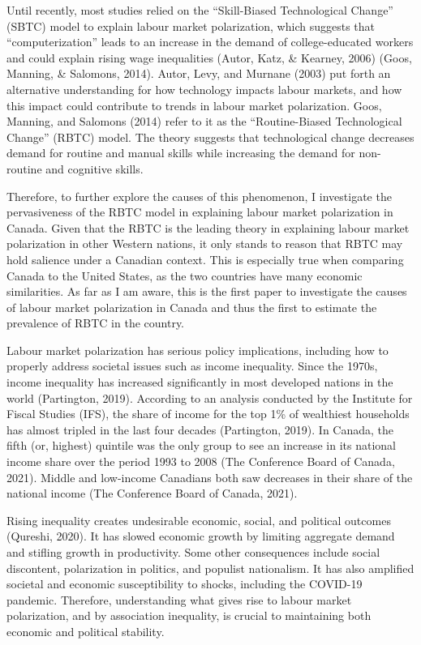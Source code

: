 \documentclass[undefended]{bumrp}
\begin{document}
Until recently, most studies relied on the “Skill-Biased Technological Change” (SBTC) model to explain labour market polarization, which suggests that “computerization” leads to an increase in the demand of college-educated workers and could explain rising wage inequalities (Autor, Katz, \& Kearney, 2006) (Goos, Manning, \& Salomons, 2014). Autor,  Levy,  and Murnane (2003) put forth an alternative understanding for how technology impacts labour markets, and how this impact could contribute to trends in labour market polarization. Goos, Manning, and Salomons (2014) refer to it as the “Routine-Biased Technological Change” (RBTC) model. The theory suggests that technological change decreases demand for routine and manual skills while increasing the demand for non-routine and cognitive skills.

Therefore, to further explore the causes of this phenomenon, I investigate the pervasiveness of the RBTC model in explaining labour market polarization in Canada. Given that the RBTC is the leading theory in explaining labour market polarization in other Western nations, it only stands to reason that RBTC may hold salience under a Canadian context. This is especially true when comparing Canada to the United States, as the two countries have many economic similarities. As far as I am aware, this is the first paper to investigate the causes of labour market polarization in Canada and thus the first to estimate the prevalence of RBTC in the country.

Labour market polarization has serious policy implications, including how to properly address societal issues such as income inequality. Since the 1970s, income inequality has increased significantly in most developed nations in the world (Partington, 2019). According to an analysis conducted by the Institute for Fiscal Studies (IFS), the share of income for the top 1\% of wealthiest households has almost tripled in the last four decades (Partington, 2019). In Canada, the fifth (or, highest) quintile was the only group to see an increase in its national income share over the period 1993 to 2008 (The Conference Board of Canada, 2021). Middle and low-income Canadians both saw decreases in their share of the national income (The Conference Board of Canada, 2021).

Rising inequality creates undesirable economic, social, and political outcomes (Qureshi, 2020). It has slowed economic growth by limiting aggregate demand and stifling growth in productivity. Some other consequences include social discontent, polarization in politics, and populist nationalism. It has also amplified societal and economic susceptibility to shocks, including the COVID-19 pandemic. Therefore, understanding what gives rise to labour market polarization, and by association inequality, is crucial to maintaining both economic and political stability. 
\end{document}
